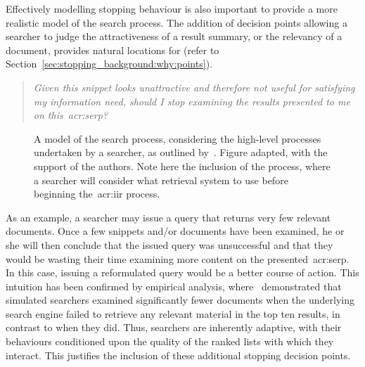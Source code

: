 Effectively modelling stopping behaviour is also important to provide a more realistic model of the search process. The addition of decision points allowing a searcher to judge the attractiveness of a result summary, or the relevancy of a document, provides natural locations for  (refer to Section~\ref{sec:stopping_background:why:points}).

\begin{quote}
\emph{Given this snippet looks unattractive and therefore not useful for satisfying my information need, should I stop examining the results presented to me on this~\gls{acr:serp}?}
\end{quote}

\begin{figure}[t!]
    \centering
    \caption[Model of the search process by~\cite{thomas2014modelling_behaviour}]{A model of the search process, considering the high-level processes undertaken by a searcher, as outlined by~\cite{thomas2014modelling_behaviour}. Figure adapted, with the support of the authors. Note here the inclusion of the  process, where a searcher will consider what retrieval system to use before beginning the~\gls{acr:iir} process.}
    \label{fig:thomas_model}
\end{figure}

As an example, a searcher may issue a query that returns very few relevant documents. Once a few snippets and/or documents have been examined, he or she will then conclude that the issued query was unsuccessful and that they would be wasting their time examining more content on the presented~\gls{acr:serp}. In this case, issuing a reformulated query would be a better course of action. This intuition has been confirmed by empirical analysis, where~\cite{azzopardi2011economics} demonstrated that simulated searchers examined significantly fewer documents when the underlying search engine failed to retrieve any relevant material in the top ten results, in contrast to when they did. Thus, searchers are inherently adaptive, with their behaviours conditioned upon the quality of the ranked lists with which they interact. This justifies the inclusion of these additional stopping decision points.

